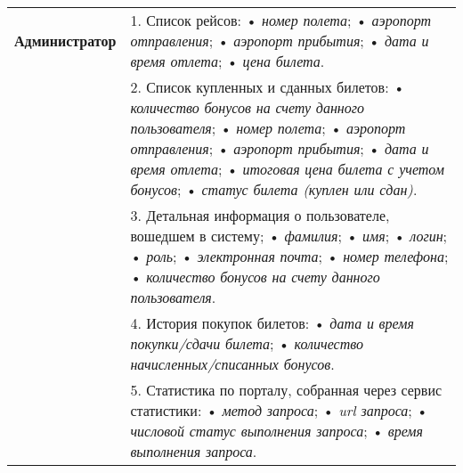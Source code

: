 \begin{longtable}{|p{0.5cm}|p{15.5cm}|}
  \hline
	\begin{rotatebox}[origin=r]{90}
		{\textbf{Администратор}}
	\end{rotatebox} 
	& 
	1. Список рейсов: \newline
    • \textit{номер полета}; \newline
    • \textit{аэропорт отправления}; \newline
    • \textit{аэропорт прибытия}; \newline
    • \textit{дата и время отлета}; \newline
    • \textit{цена билета}. \\
	\cline{2-2}
    &
  2. Список купленных и сданных билетов: \newline
    • \textit{количество бонусов на счету данного пользователя}; \newline
    • \textit{номер полета}; \newline
    • \textit{аэропорт отправления}; \newline
    • \textit{аэропорт прибытия}; \newline
    • \textit{дата и время отлета}; \newline
    • \textit{итоговая цена билета с учетом бонусов}; \newline
    • \textit{статус билета (куплен или сдан)}. \\
	\cline{2-2}
    &
  3. Детальная информация о пользователе, вошедшем в систему; \newline
    • \textit{фамилия}; \newline
    • \textit{имя}; \newline
    • \textit{логин}; \newline
    • \textit{роль}; \newline
    • \textit{электронная почта}; \newline
    • \textit{номер телефона}; \newline
    • \textit{количество бонусов на счету данного пользователя}.\\
	\cline{2-2}
	&
	4. История покупок билетов: \newline
    • \textit{дата и время покупки/сдачи билета}; \newline
    • \textit{количество начисленных/списанных бонусов}. \\
	\cline{2-2}
  &
  5. Статистика по порталу, собранная через сервис статистики: \newline
    • \textit{метод запроса}; \newline
    • \textit{url запроса}; \newline
    • \textit{числовой статус выполнения запроса}; \newline
    • \textit{время выполнения запроса}. \\
	\hline
\end{longtable}


